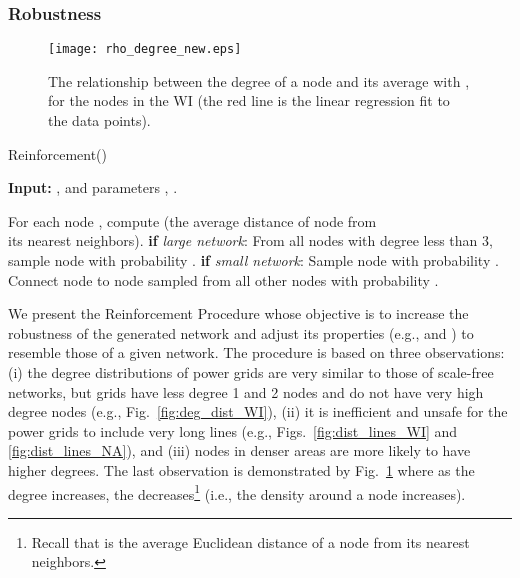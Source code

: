 \documentclass[10pt,journal]{IEEEtran}
\begin{document}
\subsubsection{Robustness}

\begin{figure}[t]
\centering
\vspace*{-0.2cm}
\texttt{[image: rho\_degree\_new.eps]}
\vspace*{-0.2cm}
\caption{The relationship between the degree of a node and its average  with , for the nodes in the WI
(the red line is the linear regression fit to the data points).}
\label{fig:rho_degree}
\vspace*{0.2cm}
\end{figure}

\begin{procedure}[t]
\footnotesize
\caption{Reinforcement()}
\begin{trivlist}
\item\textbf{Input:} , and parameters , .
\end{trivlist}
\vspace*{-3mm}
\begin{algorithmic}[1]
\STATE For each node , compute  (the average distance of node  from \\its  nearest neighbors).
\STATE \textbf{if} \emph{large network}: From all nodes with degree less than 3,\\ sample node   with probability .
\STATE \textbf{if} \emph{small network}: Sample node   with probability .
\STATE Connect node  to node  sampled from all other nodes with probability .
\ENDFOR
\end{algorithmic}
\label{pro:add_edge}
\end{procedure}
We present the Reinforcement Procedure whose objective is to increase the robustness of the generated network and adjust its properties (e.g.,  and ) to resemble those of a given network. The procedure is based on three observations: (i) the degree distributions of power grids are very similar to those of scale-free networks, but grids have less degree 1 and 2 nodes and do not have very high degree nodes (e.g., Fig.~\ref{fig:deg_dist_WI}), (ii) it is inefficient and unsafe for the power grids to include very long lines (e.g., Figs.~\ref{fig:dist_lines_WI} and \ref{fig:dist_lines_NA}), and (iii) nodes in denser areas are more likely to have higher degrees. The last observation is demonstrated by Fig.~\ref{fig:rho_degree} where as  the degree increases, the  decreases\footnote{Recall that  is the average Euclidean distance of a node from its  nearest neighbors.} (i.e., the density around a node increases).
\end{document}
